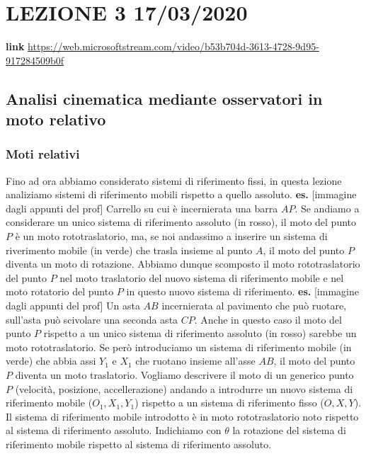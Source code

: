 \section{LEZIONE 3 17/03/2020}
\textbf{link} \url{https://web.microsoftstream.com/video/b53b704d-3613-4728-9d95-917284509b0f}
\subsection{Analisi cinematica mediante osservatori in moto relativo}
\subsubsection{Moti relativi}
Fino ad ora abbiamo considerato sistemi di riferimento fissi, in questa lezione analiziamo sistemi di riferimento mobili rispetto a quello assoluto.\newline
\newline
\textbf{es.} [immagine dagli appunti del prof]\newline
Carrello su cui è incernierata una barra $AP$. Se andiamo a considerare un unico sistema di riferimento assoluto (in rosso), il moto del punto $P$ è un moto rototraslatorio, ma, se noi andassimo a inserire un sistema di riverimento mobile (in verde) che trasla insieme al punto $A$, il moto del punto $P$ diventa un moto di rotazione. Abbiamo dunque scomposto il moto rototraslatorio del punto $P$ nel moto traslatorio del nuovo sistema di riferimento mobile e nel moto rotatorio del punto $P$ in questo nuovo sistema di riferimento.\newline
\newline
\textbf{es.} [immagine dagli appunti del prof]\newline
Un asta $AB$ incernierata al pavimento che può ruotare, sull'asta può scivolare una seconda asta $CP$. Anche in questo caso il moto del punto $P$ rispetto a un unico sistema di riferimento assoluto (in rosso) sarebbe un moto rototraslatorio. Se però introduciamo un sistema di riferimento mobile (in verde) che abbia assi $Y_1$ e $X_1$ che ruotano insieme all'asse $AB$, il moto del punto $P$ diventa un moto traslatorio.\newline
{}\newline
Vogliamo descrivere il moto di un generico punto $P$ (velocità, posizione, accellerazione) andando a introdurre un nuovo sistema di riferimento mobile ($O_1, X_1, Y_1$) rispetto a un sistema di riferimento fisso ($O, X, Y$).\newline
Il sistema di riferimento mobile introdotto è in moto rototraslatorio noto rispetto al sistema di riferimento assoluto.\newline
Indichiamo con $\theta$ la rotazione del sistema di riferimento mobile rispetto al sistema di riferimento assoluto.
